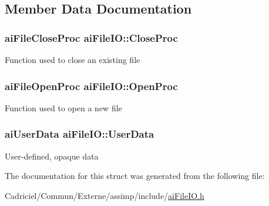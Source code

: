 \subsection{Member Data Documentation}
\hypertarget{structai_file_i_o_a7ec702672712b5a02dc49cb17f980a14}{
\subsubsection[{Close\-Proc}]{\setlength{\rightskip}{0pt plus 5cm}ai\-File\-Close\-Proc ai\-File\-I\-O\-::\-Close\-Proc}}\label{structai_file_i_o_a7ec702672712b5a02dc49cb17f980a14}
Function used to close an existing file \hypertarget{structai_file_i_o_a819d9c7823039294125068d06949a6df}{
\subsubsection[{Open\-Proc}]{\setlength{\rightskip}{0pt plus 5cm}ai\-File\-Open\-Proc ai\-File\-I\-O\-::\-Open\-Proc}}\label{structai_file_i_o_a819d9c7823039294125068d06949a6df}
Function used to open a new file \hypertarget{structai_file_i_o_a9c62b7f3d70fbb2f41e33ad0b9933139}{
\subsubsection[{User\-Data}]{\setlength{\rightskip}{0pt plus 5cm}ai\-User\-Data ai\-File\-I\-O\-::\-User\-Data}}\label{structai_file_i_o_a9c62b7f3d70fbb2f41e33ad0b9933139}
User-\/defined, opaque data 

The documentation for this struct was generated from the following file\-:\begin{DoxyCompactItemize}
\item 
Cadriciel/\-Commun/\-Externe/assimp/include/\hyperlink{ai_file_i_o_8h}{ai\-File\-I\-O.\-h}\end{DoxyCompactItemize}
